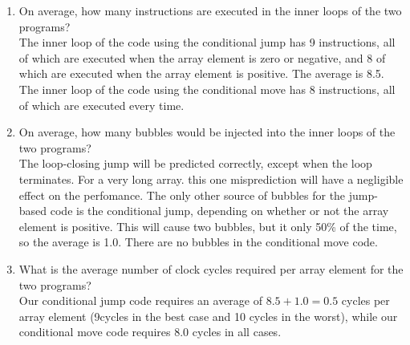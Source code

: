 \documentclass{article}
\begin{document}
\begin{enumerate}[label=\textbf{\Alph*.}]
	\item On average, how many instructions are executed in the inner loops of the
	two programs? \\
	The inner loop of the code using the conditional jump has 9 instructions,
	all of which are executed when the array element is zero or negative, and
	8 of which are executed when the array element is positive. The average is
	8.5. The inner loop of the code using the conditional move has 8 instructions,
	all of which are executed every time.
	\item On average, how many bubbles would be injected into the inner loops of the
	two programs? \\
	The loop-closing jump will be predicted correctly, except when the loop terminates.
	For a very long array. this one misprediction will have a negligible effect on the
	perfomance. The only other source of bubbles for the jump-based code is the conditional
	jump, depending on whether or not the array element is positive. This will cause two
	bubbles, but it only 50\% of the time, so the average is 1.0. There are no bubbles
	in the conditional move code.
	\item What is the average number of clock cycles required per array element for
	the two programs? \\
	Our conditional jump code requires an average of $8.5 + 1.0 = 0.5$ cycles per
	array element (9cycles in the best case and 10 cycles in the worst),
	while our conditional move code requires 8.0 cycles in all cases.
\end{enumerate}
\end{document}
